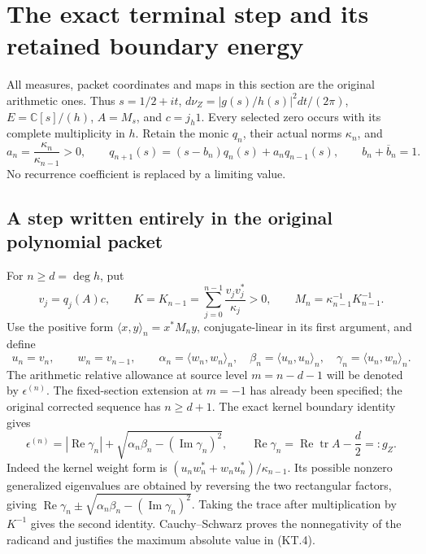\section{The exact terminal step and its retained boundary energy}
\label{sec:terminal-continuation}

All measures, packet coordinates and maps in this section are the
original arithmetic ones.  Thus \(s=1/2+it\),
\(d\nu_Z=|g(s)/h(s)|^2dt/(2\pi)\),
\(E=\mathbb C[s]/(h)\), \(A=M_s\), and \(c=j_h1\).
Every selected zero occurs with its complete multiplicity in \(h\).
Retain the monic \(q_n\), their actual norms \(\kappa_n\), and
\[
 a_n=\frac{\kappa_n}{\kappa_{n-1}}>0,\qquad
 q_{n+1}(s)=(s-b_n)q_n(s)+a_nq_{n-1}(s),\qquad
 b_n+\overline b_n=1.                                      \tag{KT.1}
\]
No recurrence coefficient is replaced by a limiting value.

\subsection{A step written entirely in the original polynomial packet}

For \(n\geq d=\deg h\), put
\[
 v_j=q_j(A)c,\qquad K=K_{n-1}=\sum_{j=0}^{n-1}
                     \frac{v_jv_j^*}{\kappa_j}>0,
 \qquad M_n=\kappa_{n-1}^{-1}K_{n-1}^{-1}.
                                                               \tag{KT.2}
\]
Use the positive form \(\langle x,y\rangle_n=x^*M_ny\),
conjugate-linear in its first argument, and define
\[
 u_n=v_n,\qquad w_n=v_{n-1},\qquad
 \alpha_n=\langle w_n,w_n\rangle_n,\quad
 \beta_n=\langle u_n,u_n\rangle_n,\quad
 \gamma_n=\langle u_n,w_n\rangle_n.
                                                               \tag{KT.3}
\]
The arithmetic relative allowance at source level \(m=n-d-1\)
will be denoted by \(\epsilon^{(n)}\).  The fixed-section extension
at \(m=-1\) has already been specified; the original corrected
sequence has \(n\geq d+1\).
The exact kernel boundary identity gives
\[
 \epsilon^{(n)}=|\operatorname{Re}\gamma_n|
   +\sqrt{\alpha_n\beta_n-(\operatorname{Im}\gamma_n)^2},
 \qquad
 \operatorname{Re}\gamma_n
       =\operatorname{Re}\operatorname{tr}A-\frac d2=:g_Z.
                                                               \tag{KT.4}
\]
Indeed the kernel weight form is
\((u_nw_n^*+w_nu_n^*)/\kappa_{n-1}\).  Its possible nonzero
generalized eigenvalues are obtained by reversing the two
rectangular factors, giving
\(\operatorname{Re}\gamma_n\pm
\sqrt{\alpha_n\beta_n-(\operatorname{Im}\gamma_n)^2}\).
Taking the trace after multiplication by \(K^{-1}\) gives the
second identity.  Cauchy--Schwarz proves the nonnegativity of the
radicand and justifies the maximum absolute value in (KT.4).


